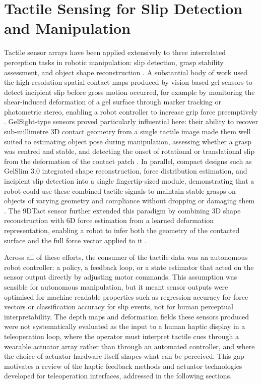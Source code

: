 \documentclass[12pt, a4paper]{report}
\begin{document}
\section{Tactile Sensing for Slip Detection and Manipulation}
Tactile sensor arrays have been applied extensively to three interrelated perception tasks in robotic manipulation: slip detection, grasp stability assessment, and object shape reconstruction \cite{dahiya2010}. A substantial body of work used the high-resolution spatial contact maps produced by vision-based gel sensors to detect incipient slip before gross motion occurred, for example by monitoring the shear-induced deformation of a gel surface through marker tracking or photometric stereo, enabling a robot controller to increase grip force preemptively \cite{donggelsight2021}. GelSight-type sensors proved particularly influential here: their ability to recover sub-millimetre 3D contact geometry from a single tactile image made them well suited to estimating object pose during manipulation, assessing whether a grasp was centred and stable, and detecting the onset of rotational or translational slip from the deformation of the contact patch \cite{donggelsight2021}. In parallel, compact designs such as GelSlim 3.0 integrated shape reconstruction, force distribution estimation, and incipient slip detection into a single fingertip-sized module, demonstrating that a robot could use these combined tactile signals to maintain stable grasps on objects of varying geometry and compliance without dropping or damaging them \cite{taylor2021}. The 9DTact sensor further extended this paradigm by combining 3D shape reconstruction with 6D force estimation from a learned deformation representation, enabling a robot to infer both the geometry of the contacted surface and the full force vector applied to it \cite{lin2023}.

Across all of these efforts, the consumer of the tactile data was an autonomous robot controller: a policy, a feedback loop, or a state estimator that acted on the sensor output directly by adjusting motor commands. This assumption was sensible for autonomous manipulation, but it meant sensor outputs were optimised for machine-readable properties such as regression accuracy for force vectors or classification accuracy for slip events, not for human perceptual interpretability. The depth maps and deformation fields these sensors produced were not systematically evaluated as the input to a human haptic display in a teleoperation loop, where the operator must interpret tactile cues through a wearable actuator array rather than through an automated controller, and where the choice of actuator hardware itself shapes what can be perceived. This gap motivates a review of the haptic feedback methods and actuator technologies developed for teleoperation interfaces, addressed in the following sections.
\end{document}
